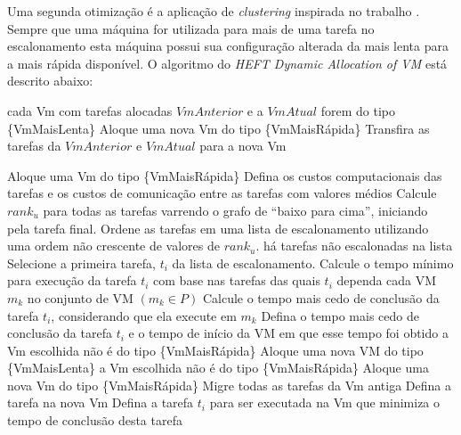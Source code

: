 Uma segunda otimização é a aplicação de \emph{clustering} inspirada no trabalho
\cite{chen:workflowsim}. Sempre que uma máquina for utilizada para mais de uma
tarefa no escalonamento esta máquina possui sua configuração alterada da mais
lenta para a mais rápida disponível. O algoritmo do \emph{HEFT Dynamic Allocation
of VM} está descrito abaixo:

\begin{codebox}
	\li \For cada Vm com tarefas alocadas
		\li \Do \If $VmAnterior$ e a $VmAtual$ forem do tipo \{VmMaisLenta\}
			\li \Do Aloque uma nova Vm do tipo \{VmMaisRápida\}
			\li Transfira as tarefas da $VmAnterior$ e $VmAtual$ para a nova Vm
		\End
	\End
\end{codebox}

\begin{codebox}
\li Aloque uma Vm do tipo \{VmMaisRápida\}
\li	Defina os custos computacionais das tarefas e os custos de comunicação entre as tarefas
\zi com valores médios
\li	Calcule $rank_u$ para todas as tarefas varrendo o grafo de ``baixo para cima'',
	iniciando \\pela tarefa final.
\li Ordene as tarefas em uma lista de escalonamento utilizando uma ordem não
\zi crescente de valores de $rank_u$.
\li 	\While há tarefas não escalonadas na lista
\li 		\Do
				Selecione a primeira tarefa, $t_i$ da lista de escalonamento.
\li 			Calcule o tempo mínimo para execução da tarefa $t_i$ com base nas tarefas
\zi das quais $t_i$ dependa				
\li				\For cada VM $m_k$ no conjunto de VM $(m_k \in P)$
\li 				\Do
						Calcule o tempo mais cedo de conclusão da tarefa  $t_i$,
						considerando que ela execute 
\zi         em $m_k$
					\End
\li				Defina o tempo mais cedo de conclusão da tarefa $t_i$ e o tempo
				de início da VM em que esse tempo foi obtido
\li			\If a Vm escolhida não é do tipo \{VmMaisRápida\}
\li				\Then
					Aloque uma nova VM do tipo \{VmMaisLenta\}
\li				\Else
\li					\If a Vm escolhida não é do tipo \{VmMaisRápida\}
\li 					\Then
							Aloque uma nova Vm do tipo \{VmMaisRápida\}
\li							Migre todas as tarefas da Vm antiga
\li 						Defina a tarefa na nova Vm
\li						\Else
\li							Defina a tarefa $t_i$ para ser executada na Vm que
							minimiza o tempo de
\zi							conclusão desta tarefa
						\End
				\End
			\End
\End
\end{codebox}


